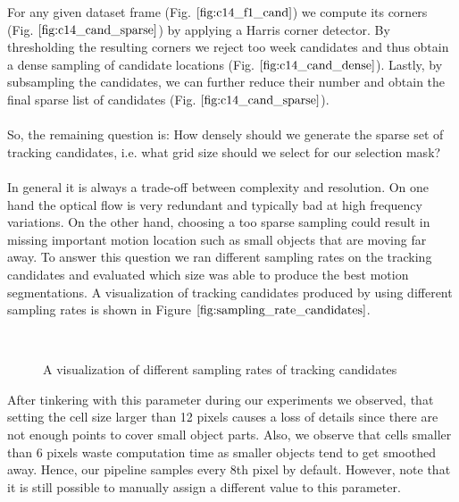 For any given dataset frame (Fig. $\ref{fig:c14_f1_cand}$) we compute its corners (Fig. $\ref{fig:c14_cand_sparse}$) by applying a Harris corner detector. By thresholding the resulting corners we reject too week candidates and thus obtain a dense sampling of candidate locations (Fig. $\ref{fig:c14_cand_dense}$). Lastly, by subsampling the candidates, we can further reduce their number and obtain the final sparse list of candidates (Fig. $\ref{fig:c14_cand_sparse}$). \\ \\ 
So, the remaining question is: How densely should we generate the sparse set of tracking candidates, i.e. what grid size should we select for our selection mask? \\ \\
In general it is always a trade-off between complexity and resolution. On one hand the optical flow is very redundant and typically bad at high frequency variations. On the other hand, choosing a too sparse sampling could result in missing important motion location such as small objects that are moving far away. To answer this question we ran different sampling rates on the tracking candidates and evaluated which size was able to produce the best motion segmentations. A visualization of tracking candidates produced by using different sampling rates is shown in Figure $\ref{fig:sampling_rate_candidates}$. 
\begin{figure}[H]
\begin{center}
~
\end{center}
\caption[Density Of Candidates For Different Sampling Rates]{A visualization of different sampling rates of tracking candidates}
\label{fig:sampling_rate_candidates}
\end{figure}
After tinkering with this parameter during our experiments we observed, that setting the cell size larger than 12 pixels causes a loss of details since there are not enough points to cover small object parts. Also, we observe that cells smaller than 6 pixels waste computation time as smaller objects tend to get smoothed away. Hence, our pipeline samples every 8th pixel by default. However, note that it is still possible to manually assign a different value to this parameter. \\ \\
